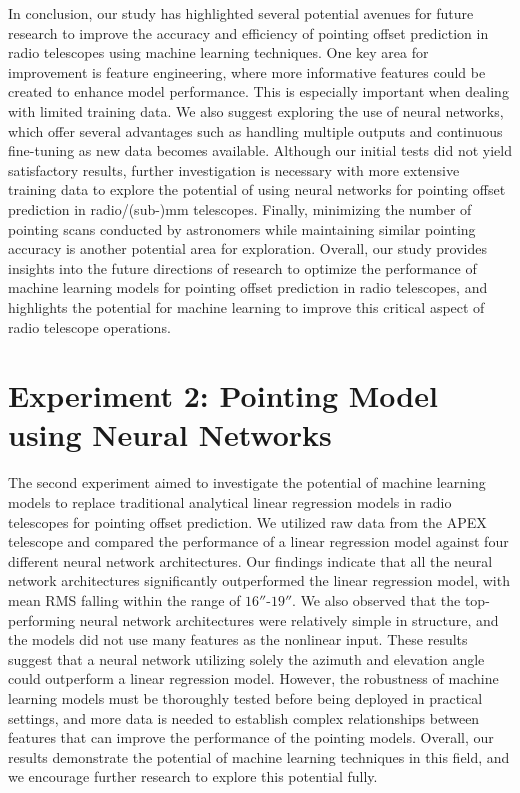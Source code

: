 In conclusion, our study has highlighted several potential avenues for future research to improve the accuracy and efficiency of pointing offset prediction in radio telescopes using machine learning techniques.
One key area for improvement is feature engineering, where more informative features could be created to enhance model performance.
This is especially important when dealing with limited training data.
We also suggest exploring the use of neural networks, which offer several advantages such as handling multiple outputs and continuous fine-tuning as new data becomes available.
Although our initial tests did not yield satisfactory results,
further investigation is necessary with more extensive training data to explore the potential of using neural networks for pointing offset prediction in radio/(sub-)mm telescopes.
Finally, minimizing the number of pointing scans conducted by astronomers while maintaining similar pointing accuracy is another potential area for exploration.
Overall, our study provides insights into the future directions of research to optimize the performance of machine learning models for pointing offset prediction in radio telescopes,
and highlights the potential for machine learning to improve this critical aspect of radio telescope operations.

\section{Experiment 2: Pointing Model using Neural Networks}
The second experiment aimed to investigate the potential of machine learning models to replace traditional analytical linear regression models in radio telescopes for pointing offset prediction.
We utilized raw data from the APEX telescope and compared the performance of a linear regression model against four different neural network architectures.
Our findings indicate that all the neural network architectures significantly outperformed the linear regression model, with mean RMS falling within the range of $16''$-$19''$.
We also observed that the top-performing neural network architectures were relatively simple in structure, and the models did not use many features as the nonlinear input.
These results suggest that a neural network utilizing solely the azimuth and elevation angle could outperform a linear regression model.
However, the robustness of machine learning models must be thoroughly tested before being deployed in practical settings, and more data is needed to establish complex relationships between features that can improve the performance of the pointing models.
Overall, our results demonstrate the potential of machine learning techniques in this field, and we encourage further research to explore this potential fully.

